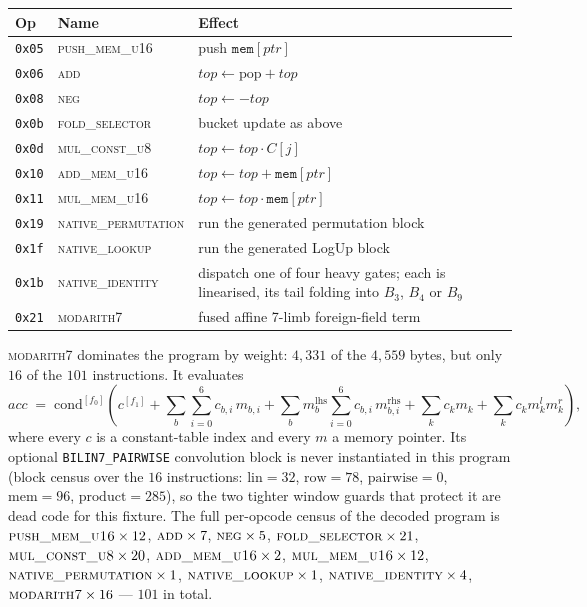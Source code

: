 \documentclass[11pt,a4paper]{article}
\newcommand{\code}[1]{\texttt{#1}}
\newcommand{\opc}[1]{\textsc{#1}}
\theoremstyle{definition}
\begin{document}
\begin{center}
\begin{tabular}{@{}llp{8.0cm}@{}}
\toprule
Op & Name & Effect \\
\midrule
\code{0x05} & \opc{push\_mem\_u16} & push $\code{mem}[\mathit{ptr}]$ \\
\code{0x06} & \opc{add}            & $\mathit{top} \leftarrow \mathrm{pop} + \mathit{top}$ \\
\code{0x08} & \opc{neg}            & $\mathit{top} \leftarrow -\mathit{top}$ \\
\code{0x0b} & \opc{fold\_selector} & bucket update as above \\
\code{0x0d} & \opc{mul\_const\_u8} & $\mathit{top} \leftarrow \mathit{top}\cdot C[j]$ \\
\code{0x10} & \opc{add\_mem\_u16}  & $\mathit{top} \leftarrow \mathit{top} + \code{mem}[\mathit{ptr}]$ \\
\code{0x11} & \opc{mul\_mem\_u16}  & $\mathit{top} \leftarrow \mathit{top}\cdot \code{mem}[\mathit{ptr}]$ \\
\code{0x19} & \opc{native\_permutation} & run the generated permutation block \\
\code{0x1f} & \opc{native\_lookup}      & run the generated LogUp block \\
\code{0x1b} & \opc{native\_identity}    & dispatch one of four heavy gates; each is linearised, its tail folding into $B_3$, $B_4$ or $B_9$ \\
\code{0x21} & \opc{modarith7}           & fused affine 7-limb foreign-field term \\
\bottomrule
\end{tabular}
\end{center}

\noindent
\opc{modarith7} dominates the program by weight: $4{,}331$ of the $4{,}559$
bytes, but only $16$ of the $101$ instructions. It evaluates
\begin{equation}
\mathit{acc} \;=\;
\mathrm{cond}^{[f_0]}\!\left(
c^{[f_1]}
+ \sum_{b}\sum_{i=0}^{6} c_{b,i}\,m_{b,i}
+ \sum_{b} m^{\mathrm{lhs}}_{b}\sum_{i=0}^{6} c_{b,i}\,m^{\mathrm{rhs}}_{b,i}
+ \sum_{k} c_k m_k
+ \sum_{k} c_k m^{l}_{k} m^{r}_{k}
\right),
\end{equation}
where every $c$ is a constant-table index and every $m$ a memory pointer. Its
optional \code{BILIN7\_PAIRWISE} convolution block is never instantiated in
this program (block census over the $16$ instructions:
$\mathrm{lin}=32$, $\mathrm{row}=78$, $\mathrm{pairwise}=0$,
$\mathrm{mem}=96$, $\mathrm{product}=285$), so the two tighter window guards
that protect it are dead code for this fixture. The full per-opcode census of
the decoded program is
$\opc{push\_mem\_u16}\times 12$, $\opc{add}\times 7$, $\opc{neg}\times 5$,
$\opc{fold\_selector}\times 21$, $\opc{mul\_const\_u8}\times 20$,
$\opc{add\_mem\_u16}\times 2$, $\opc{mul\_mem\_u16}\times 12$,
$\opc{native\_permutation}\times 1$, $\opc{native\_lookup}\times 1$,
$\opc{native\_identity}\times 4$, $\opc{modarith7}\times 16$ ---
$101$ in total.
\end{document}
